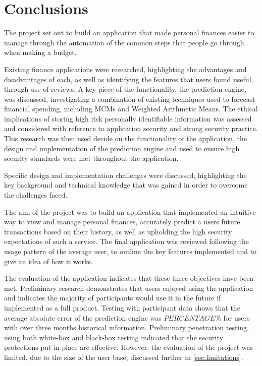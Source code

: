 \chapter{Conclusions}
\label{cha:conclusions}

\begin{comment}
Chapter 7: Conclusions
This can be a short chapter summarizing what you have achieved and what you have learned from the achievement. It is different from the abstract. The main results of your work should be highlighted with a critical appraisal of them indicating the extent to which the objectives outlined in Chapter 1 have been met. Exaggerated claims are counterproductive here. Recommendations for further activity are often included in this chapter.
\end{comment}

The project set out to build an application that made personal finances easier to manage through the automation of the common steps that people go through when making a budget.

Existing finance applications were researched, highlighting the advantages and disadvantages of each, as well as identifying the features that users found useful, through use of reviews.
%
A key piece of the functionality, the prediction engine, was discussed, investigating a combination of existing techniques used to forecast financial spending, including MCMs and Weighted Arithmetic Means. 
%
The ethical implications of storing high risk personally identifiable information was assessed and considered with reference to application security and strong security practice.
%
This research was then used decide on the functionality of the application, the design and implementation of the prediction engine and used to ensure high security standards were met throughout the application.

Specific design and implementation challenges were discussed, highlighting the key background and technical knowledge that was gained in order to overcome the challenges faced.

The aim of the project was to build an application that implemented an intuitive way to view and manage personal finances, accurately predict a users future \glspl{transaction} based on their history, as well as upholding the high security expectations of such a service.
%
The final application was reviewed following the usage pattern of the average user, to outline the key features implemented and to give an idea of how it works.

The evaluation of the application indicates that these three objectives have been met. Preliminary research demonstrates that users enjoyed using the application and indicates the majority of participants would use it in the future if implemented as a full product. Testing with participant data shows that the average absolute error of the prediction engine was $PERCENTAGE\%$ for users with over three months historical information. Preliminary penetration testing, using both white-box and black-box testing indicated that the security protections put in place are effective.  However, the evaluation of the project was limited, due to the size of the user base, discussed further in \autoref{sec:limitations}. 

